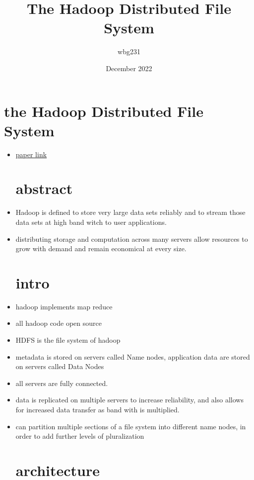 \documentclass{article}
\title{The Hadoop Distributed File System}
\author{wbg231 }
\date{December 2022}
\begin{document}
\maketitle

\section*{the Hadoop Distributed File System}
\begin{itemize}
\item \href{https://brightspace.nyu.edu/d2l/le/lessons/261985/topics/8157424}{paper link}
\section{abstract}
\item Hadoop is defined to store very large data sets reliably and to stream those data sets at high band witch to user applications. 
\item distributing storage and computation across many servers allow resources to grow with demand and remain economical at every size.
\section{intro}
\item hadoop implements map reduce
\item all hadoop code open source
\item HDFS is the file system of hadoop
\item metadata is stored on servers called Name nodes, application data are stored on servers called Data Nodes
\item all servers are fully connected.
\item data is replicated on multiple servers to increase reliability, and also allows for increased data transfer as band with is multiplied. 
\item can partition multiple sections of a file system into different name nodes, in order to add further levels of pluralization
\section{architecture}

\end{itemize}
\end{document}
